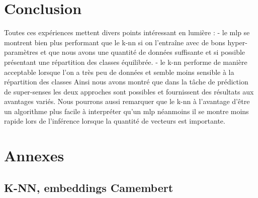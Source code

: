 \documentclass[12pt]{article}
\begin{document}
\section{Conclusion}

Toutes ces expériences mettent divers points intéressant en lumière : 
- le mlp se montrent bien plus performant que le k-nn si on l'entraîne avec de bons hyper-paramètres
et que nous avons une quantité de données suffisante et si possible présentant une répartition des classes équilibrée.
- le k-nn performe de manière acceptable lorsque l'on a très peu de données et semble moins sensible à la répartition des classes
Ainsi nous avons montré que dans la tâche de prédiction de super-senses les deux approches sont possibles et fournissent des résultats aux 
avantages variés. Nous pourrons aussi remarquer que le k-nn à l'avantage d'être un algorithme plus facile à interpréter qu'un mlp néanmoins 
il se montre moins rapide lors de l'inférence lorsque la quantité de vecteurs est importante. 

\renewcommand{\refname}{Bibliographie}

 

\section{Annexes}

\subsection{K-NN, embeddings Camembert}
\end{document}
